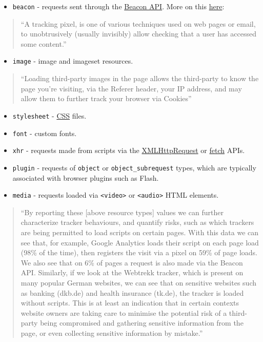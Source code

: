 \documentclass[
]{article}
\providecommand{\tightlist}{%
  \setlength{\itemsep}{0pt}\setlength{\parskip}{0pt}}
\begin{document}
\begin{itemize}
\tightlist
\item
  \texttt{beacon} - requests sent through the
  \href{https://bit.ly/3hxqbKK}{Beacon API}. More on this
  \href{https://bit.ly/2WPDUEC}{here}:
\end{itemize}

\begin{quote}
``A tracking pixel, is one of various techniques used on web pages or
email, to unobtrusively (usually invisibly) allow checking that a user
has accessed some content.''
\end{quote}

\begin{itemize}
\tightlist
\item
  \texttt{image} - image and imageset resources.
\end{itemize}

\begin{quote}
``Loading third-party images in the page allows the third-party to know
the page you're visiting, via the Referer header, your IP address, and
may allow them to further track your browser via Cookies''
\end{quote}

\begin{itemize}
\item
  \texttt{stylesheet} -
  \href{https://developer.mozilla.org/en-US/docs/Web/CSS}{CSS} files.
\item
  \texttt{font} - custom fonts.
\item
  \texttt{xhr} - requests made from scripts via the
  \href{https://developer.mozilla.org/en-US/docs/Web/API/XMLHttpRequest}{XMLHttpRequest}
  or
  \href{https://developer.mozilla.org/en-US/docs/Web/API/Fetch_API}{fetch}
  APIs.
\item
  \texttt{plugin} - requests of \texttt{object} or
  \texttt{object\_subrequest} types, which are typically associated with
  browser plugins such as Flash.
\item
  \texttt{media} - requests loaded via
  \texttt{\textless{}video\textgreater{}} or
  \texttt{\textless{}audio\textgreater{}} HTML elements.
\end{itemize}

\begin{quote}
``By reporting these {[}above resource types{]} values we can further
characterize tracker behaviours, and quantify risks, such as which
trackers are being permitted to load scripts on certain pages. With this
data we can see that, for example, Google Analytics loads their script
on each page load (98\% of the time), then registers the visit via a
pixel on 59\% of page loads. We also see that on 6\% of pages a request
is also made via the Beacon API. Similarly, if we look at the Webtrekk
tracker, which is present on many popular German websites, we can see
that on sensitive websites such as banking (dkb.de) and health insurance
(tk.de), the tracker is loaded without scripts. This is at least an
indication that in certain contexts website owners are taking care to
minimise the potential risk of a third-party being compromised and
gathering sensitive information from the page, or even collecting
sensitive information by mistake.''
\end{quote}
\end{document}
